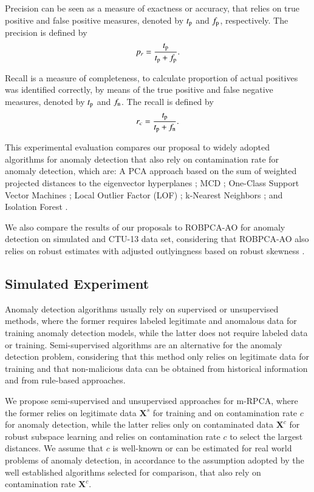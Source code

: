 \documentclass[review]{elsarticle}
\begin{document}
Precision can be seen as a measure of exactness or accuracy, that relies on true positive and false positive measures, denoted by $t_{\rm p}$ and $f_{\rm p}$, respectively. The precision is defined by 
\begin{equation}\label{eq:4.16}
	p_r = \frac{t_{\rm p}}{t_{\rm p} + f_{\rm p}}.
\end{equation}

Recall is a measure of completeness, to calculate proportion of actual positives was identified correctly, by means of the true positive and false negative measures, denoted by $t_{\rm p}$ and $f_{\rm n}$. The recall is defined by 
\begin{equation}\label{eq:4.17}
	r_c = \frac{t_{\rm p}}{t_{\rm p} + f_{\rm n}}.
\end{equation}

This experimental evaluation compares our proposal to widely adopted algorithms for anomaly detection that also rely on contamination rate for anomaly detection, which are: A PCA approach based on the sum of weighted projected distances to the eigenvector hyperplanes \cite{shyu2003novel}; MCD \cite{rousseeuw1984mcd,rousseeuw1999fastmcd}; One-Class Support Vector Machines \cite{scholkopf2001estimating}; Local Outlier Factor (LOF) \cite{breunig2000lof}; k-Nearest Neighbors \cite{angiulli2002fast}; and Isolation Forest \cite{liu2008isolation}.

We also compare the results of our proposals to ROBPCA-AO for anomaly detection on simulated and CTU-13 data set, considering that ROBPCA-AO also relies on robust estimates with adjusted outlyingness based on robust skewness \cite{hubert2009robustskewed}.

\subsection{Simulated Experiment}
\label{sec:3_SimulatedScenario}

Anomaly detection algorithms usually rely on supervised or unsupervised methods, where the former requires labeled legitimate and anomalous data for training anomaly detection models, while the latter does not require labeled data or training. Semi-supervised algorithms are an alternative for the anomaly detection problem, considering that this method only relies on legitimate data for training and that non-malicious data can be obtained from historical information and from rule-based approaches. 

We propose semi-supervised and unsupervised approaches for m-RPCA, where the former relies on legitimate data $\pmb{X}^s$ for training and on contamination rate $c$ for anomaly detection, while the latter relies only on contaminated data $\pmb{X}^c$ for robust subspace learning and relies on contamination rate $c$ to select the largest distances. We assume that $c$ is well-known or can be estimated for real world problems of anomaly detection, in accordance to the assumption adopted by the well established algorithms \cite{zhao2019pyod} selected for comparison, that also rely on contamination rate $\pmb{X}^c$.
\end{document}
